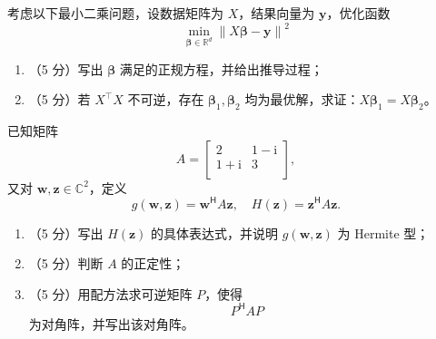 \documentclass[11pt,a4paper]{exam-zh}
\newcommand{\bvec}[1]{\boldsymbol{#1}}
\newcommand{\R}{\mathbb{R}}
\newcommand{\C}{\mathbb{C}}
\begin{document}
\begin{problem}
  考虑以下最小二乘问题，设数据矩阵为 $X$，结果向量为 $\bvec{y}$，优化函数
  $$
    \min_{\bvec{\beta} \in \R^d} \left\| X \bvec{\beta} - \bvec{y} \right\|^2
  $$
  \begin{enumerate}
    \item （5 分）写出 $\bvec{\beta}$ 满足的正规方程，并给出推导过程；
    \item （5 分）若 $X^\top X$ 不可逆，存在 $\bvec{\beta}_1, \bvec{\beta}_2$ 均为最优解，求证：$X \bvec{\beta}_1 = X \bvec{\beta}_2$。
  \end{enumerate}
\end{problem}

\begin{problem}
  已知矩阵
  $$
    A = \begin{bmatrix}
      2 & 1 - \mathrm{i} \\
      1 + \mathrm{i} & 3 \\
    \end{bmatrix},
  $$
  又对 $\bvec{w}, \bvec{z} \in \C^2$，定义
  $$
    g \left(\bvec{w}, \bvec{z}\right) = \bvec{w}^\mathsf{H} A \bvec{z}, \quad H \left(\bvec{z}\right) = \bvec{z}^\mathsf{H} A \bvec{z}.
  $$
  \begin{enumerate}
    \item （5 分）写出 $H \left(\bvec{z}\right)$ 的具体表达式，并说明 $g \left(\bvec{w}, \bvec{z}\right)$ 为 Hermite 型；
    \item （5 分）判断 $A$ 的正定性；
    \item （5 分）用配方法求可逆矩阵 $P$，使得 $$P^\mathsf{H} AP$$ 为对角阵，并写出该对角阵。
  \end{enumerate}
\end{problem}
\end{document}
